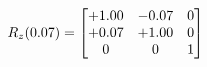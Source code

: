 \documentclass[preview]{standalone}
\begin{document}
\begin{align*}
\special{dvisvgm:raw <g id='unique000'>}R_{z}(0.07) = \begin{bmatrix}+1.00 & -0.07 & 0 \\+0.07 & +1.00 & 0 \\0 & 0 & 1\end{bmatrix}\special{dvisvgm:raw </g>}
\end{align*}
\end{document}
